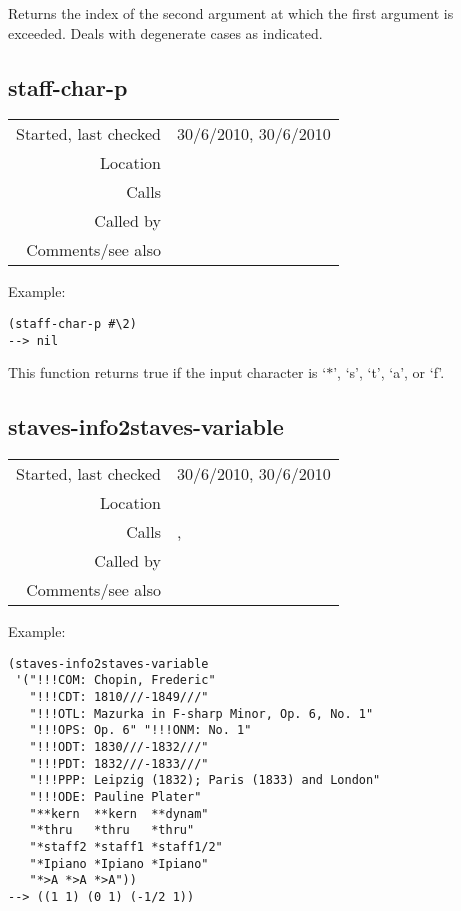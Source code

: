\noindent Returns the index of the second argument at
which the first argument is exceeded. Deals with
degenerate cases as indicated.


\subsection*{staff-char-p}\label{fun:staff-char-p}

\vspace{0.3cm}
\begin{tabular}{r|p{8cm}}
Started, last checked & 30/6/2010, 30/6/2010 \\
Location & \nameref{sec:kern} \\
Calls & \\
Called by & \nameref{fun:staves-info2staves-variable} \\
Comments/see also &
\end{tabular}

\vspace{0.5cm}
\noindent Example:
\begin{verbatim}
(staff-char-p #\2)
--> nil
\end{verbatim}

\noindent This function returns true if the input
character is `$\ast$', `s', `t', `a', or `f'.


\subsection*{staves-info2staves-variable}\label{fun:staves-info2staves-variable}

\vspace{0.3cm}
\begin{tabular}{r|p{8cm}}
Started, last checked & 30/6/2010, 30/6/2010 \\
Location & \nameref{sec:kern} \\
Calls & \nameref{fun:staff-char-p}, \nameref{fun:tab-separated-string2list} \\
Called by & \nameref{fun:kern-file2dataset} \\
Comments/see also &
\end{tabular}

\vspace{0.5cm}
\noindent Example:
\begin{Verbatim}[showtabs=true]
(staves-info2staves-variable
 '("!!!COM: Chopin, Frederic"
   "!!!CDT: 1810///-1849///"
   "!!!OTL: Mazurka in F-sharp Minor, Op. 6, No. 1"
   "!!!OPS: Op. 6" "!!!ONM: No. 1"
   "!!!ODT: 1830///-1832///"
   "!!!PDT: 1832///-1833///"
   "!!!PPP: Leipzig (1832); Paris (1833) and London"
   "!!!ODE: Pauline Plater"
   "**kern	**kern	**dynam"
   "*thru	*thru	*thru"
   "*staff2	*staff1	*staff1/2"
   "*Ipiano	*Ipiano	*Ipiano"
   "*>A	*>A	*>A"))
--> ((1 1) (0 1) (-1/2 1))
\end{Verbatim}

